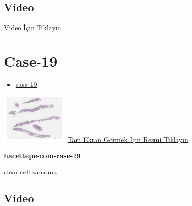 \documentclass[
  letterpaper,
  DIV=11,
  numbers=noendperiod]{scrreprt}
\providecommand{\tightlist}{%
  \setlength{\itemsep}{0pt}\setlength{\parskip}{0pt}}\usepackage{longtable,booktabs,array}
\begin{document}
\hypertarget{video-16}{%
\subsection{Video}\label{video-16}}

\href{https://www.youtube.com/watch?v=5c_5A4z6tro}{Video İçin Tıklayın}

\hypertarget{sec-hacettepe-case-of-the-month-case-19}{%
\section{Case-19}\label{sec-hacettepe-case-of-the-month-case-19}}

\begin{itemize}
\tightlist
\item
  \href{https://www.youtube.com/watch?v=SaNDCvKzQ6M\&ab_channel=KemalKosemehmetoglu}{case
  19}
\end{itemize}

\href{https://images.patolojiatlasi.com/hacettepe-com-case-1/HE.html}{\includegraphics[width=0.25\textwidth,height=\textheight]{./screenshots/hacettepe-com-case-19_screenshot.png}}
\href{https://images.patolojiatlasi.com/hacettepe-com-case-19/HE.html}{Tam
Ekran Görmek İçin Resmi Tıklayın}

\textbf{hacettepe-com-case-19}

\begin{tcolorbox}[enhanced jigsaw, left=2mm, toprule=.15mm, rightrule=.15mm, bottomrule=.15mm, leftrule=.75mm, colback=white, colframe=quarto-callout-tip-color-frame, toptitle=1mm, breakable, titlerule=0mm, colbacktitle=quarto-callout-tip-color!10!white, bottomtitle=1mm, title=\textcolor{quarto-callout-tip-color}{\faLightbulb}\hspace{0.5em}{Tanı}, arc=.35mm, opacitybacktitle=0.6, opacityback=0, coltitle=black]

clear cell sarcoma

\end{tcolorbox}

\hypertarget{video-17}{%
\subsection{Video}\label{video-17}}
\end{document}
